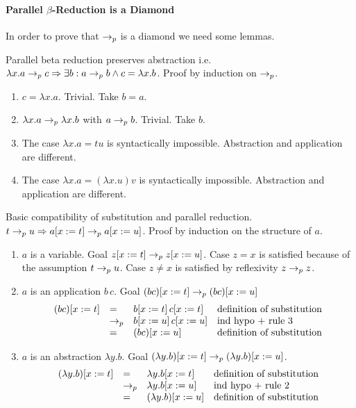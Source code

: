\paragraph{Parallel $\beta$-Reduction is a Diamond}

In order to prove that $\to_{p}$ is a diamond we need some lemmas.

\begin{lemma}
  Parallel beta reduction preserves abstraction i.e.
  $\lambda x.a \to_{p} c \Rightarrow \exists b : a \to_{p} b \land c = \lambda
  x.b$. Proof by induction on $\to_{p}$.
  \begin{enumerate}
  \item $c = \lambda x.a$. Trivial. Take $b = a$.
  \item $\lambda x.a \to_{p} \lambda x.b$ with $a \to_{p} b$. Trivial. Take $b$.
  \item The case $\lambda x.a = t u$ is syntactically impossible. Abstraction
    and application are different.
  \item The case $\lambda x.a = (\lambda x.u) v$ is syntactically
    impossible. Abstraction and application are different.
  \end{enumerate}
\end{lemma}


\begin{lemma}
  Basic compatibility of substitution and parallel reduction.
  $t \to_{p} u \Rightarrow a[x := t] \to_{p} a[x := u]$. Proof by induction on the
  structure of $a$.
  \begin{enumerate}
  \item $a$ is a variable. Goal $z[x := t] \to_{p} z[x := u]$. Case $z=x$
    is satisfied because of the assumption $t \to_{p} u$. Case $z\ne x$ is
    satisfied by reflexivity $z \to_{p} z$.
  \item
    $a$ is an application $b\, c$.
    Goal $(b c)[x:=t] \to_{p} (b c)[x:=u]$
    $$
    \begin{array}{llll}
      (b c)[x:=t] &=& b[x:=t]\, c[x:=t] &              \text{definition of substitution}\\
                      &\to_{p} & b[x:=u]\, c[x:=u] & \text{ind hypo + rule 3} \\
                      &=& (b c)[x:=u] &                       \text{definition of substitution}
    \end{array}
    $$
  \item
    $a$ is an abstraction $\lambda y.b$.
    Goal $(\lambda y.b)[x:=t] \to_{p} (\lambda y.b)[x:=u]$.
    $$
    \begin{array}{llll}
      (\lambda y.b)[x:=t] &=& \lambda y. b[x:=t]  &\text{definition of substitution}\\
      &\to_{p} & \lambda y.b[x:=u] &\text{ind hypo + rule 2} \\
      &=& (\lambda y.b)[x:=u] & \text{definition of substitution}
    \end{array}
    $$
  \end{enumerate}
\end{lemma}


